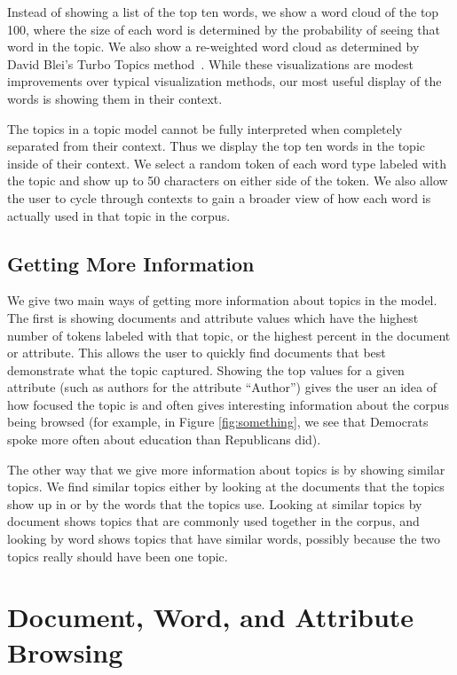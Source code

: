 \documentclass{article}
\begin{document}
Instead of showing a list of the top ten words, we show a word cloud of the top
100, where the size of each word is determined by the probability of seeing
that word in the topic.  We also show a re-weighted word cloud as determined by
David Blei's Turbo Topics method~\cite{blei-2009-turbo-topics}.  While these
visualizations are modest improvements over typical visualization methods, our
most useful display of the words is showing them in their context.

The topics in a topic model cannot be fully interpreted when completely
separated from their context.  Thus we display the top ten words in the topic
inside of their context.  We select a random token of each word type labeled
with the topic and show up to 50 characters on either side of the token.  We
also allow the user to cycle through contexts to gain a broader view of how
each word is actually used in that topic in the corpus.

\subsection{Getting More Information}

We give two main ways of getting more information about topics in the model.
The first is showing documents and attribute values which have the highest
number of tokens labeled with that topic, or the highest percent in the
document or attribute.  This allows the user to quickly find documents that
best demonstrate what the topic captured.  Showing the top values for a given
attribute (such as authors for the attribute ``Author'') gives the user an idea
of how focused the topic is and often gives interesting information about the
corpus being browsed (for example, in Figure \ref{fig:something}, we see that
Democrats spoke more often about education than Republicans did).

The other way that we give more information about topics is by showing similar
topics.  We find similar topics either by looking at the documents that the
topics show up in or by the words that the topics use.  Looking at similar
topics by document shows topics that are commonly used together in the corpus,
and looking by word shows topics that have similar words, possibly because the
two topics really should have been one topic.

\section{Document, Word, and Attribute Browsing}
\end{document}
